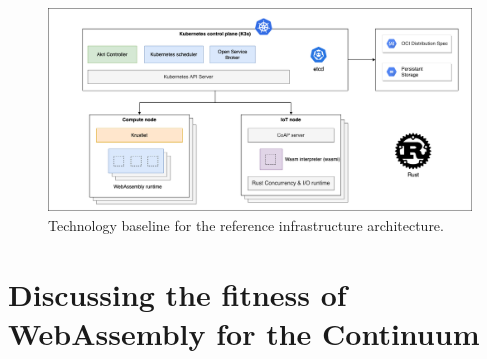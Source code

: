 \begin{figure}[ht]
\centering
\includegraphics[width=\columnwidth]{figures/architecture-technologies}
\caption{Technology baseline for the reference infrastructure architecture.} \label{fig:architecture-technologies}
\end{figure}



\section{Discussing the fitness of WebAssembly for the Continuum}\label{sec:wasm}

